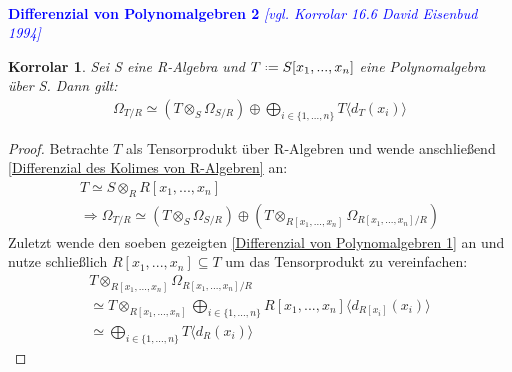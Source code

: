 \documentclass[10pt,a4paper]{report}
\newcommand{\ModulsOfDifferenzials}{David Eisenbud 1994}
\newcounter{Aussage}[chapter]
\newtheorem{korrolar}[Aussage]{Korrolar}
\newcommand{\divR}[2]{\Omega_{#1/#2}}
\newcommand{\divf}[1]{d_{#1}}
\newcommand{\Tensor}[3]{#1 \otimes_{#2} #3}
\newcommand*{\defeq}{\mathrel{\vcenter{\baselineskip0.5ex \lineskiplimit0pt
                     \hbox{\scriptsize.}\hbox{\scriptsize.}}}%
                     =}
\newcommand{\Verz}[1]{\langle #1 \rangle}
\begin{document}
\ \\
\textcolor{blue}{\textbf{Differenzial von Polynomalgebren 2} \textit{[vgl. Korrolar 16.6 \ModulsOfDifferenzials]}}
\begin{korrolar}\label{Differenzial von Polynomalgebren 2}
Sei S eine R-Algebra und $T \defeq S[x_1,...,x_n]$ eine Polynomalgebra über S. Dann gilt:
\begin{gather*}
\divR{T}{R} \simeq (\Tensor{T}{S}{\divR{S}{R}}) \oplus \bigoplus_{i \in \lbrace 1,...,n \rbrace} T \Verz{\divf{T}(x_i)}
\end{gather*}
\end{korrolar}
\begin{proof}
Betrachte $T$ als Tensorprodukt über R-Algebren und wende anschließend \cref{Differenzial des Kolimes von R-Algebren} an:
\begin{gather*}
T \simeq \Tensor{S}{R}{R[x_1,...,x_n]} \\
\Rightarrow \divR{T}{R} \simeq (\Tensor{T}{S}{\divR{S}{R}}) \oplus (\Tensor{T}{R[x_1,...,x_n]}{\divR{R[x_1,...,x_n]}{R}})
\end{gather*}
Zuletzt wende den soeben gezeigten \cref{Differenzial von Polynomalgebren 1} an und nutze schließlich $R[x_1,...,x_n] \subseteq T$ um das Tensorprodukt zu vereinfachen:
\begin{gather*}
\Tensor{T}{R[x_1,...,x_n]}{\divR{R[x_1,...,x_n]}{R}}\\
\simeq \Tensor{T}{R[x_1,...,x_n]}{\bigoplus_{i \in \lbrace 1,...,n \rbrace} R[x_1,...,x_n]\langle \divf{R[x_i]}(x_i) \rangle } \\
\simeq \bigoplus_{i \in \lbrace 1,...,n \rbrace} T \langle \divf{R}(x_i) \rangle
\end{gather*}
\end{proof}
\end{document}
